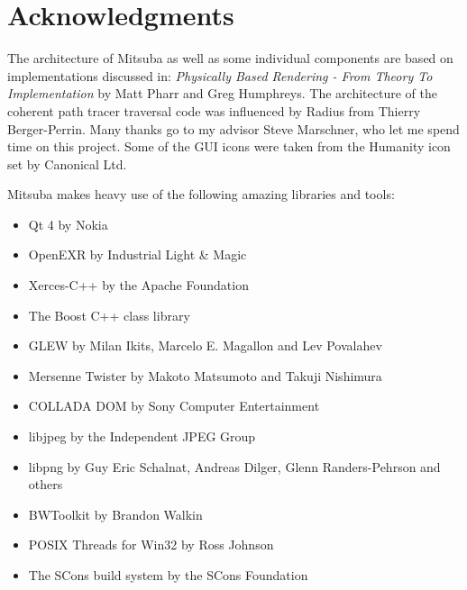 \section{Acknowledgments}
The architecture of Mitsuba as well as some individual components are based on implementations discussed in: \emph{Physically Based Rendering - From Theory To Implementation} by Matt Pharr and Greg Humphreys.
The architecture of the coherent path tracer traversal code was influenced by Radius from Thierry Berger-Perrin.
Many thanks go to my advisor Steve Marschner, who let me spend time on this project.
Some of the GUI icons were taken from the Humanity icon set by Canonical Ltd.

Mitsuba makes heavy use of the following amazing libraries and tools: 
\begin{itemize}
\item Qt 4 by Nokia
\item OpenEXR by Industrial Light \& Magic
\item Xerces-C+\!+ by the Apache Foundation
\item The Boost C+\!+ class library
\item GLEW by Milan Ikits, Marcelo E. Magallon and Lev Povalahev
\item Mersenne Twister by Makoto Matsumoto and Takuji Nishimura
\item COLLADA DOM by Sony Computer Entertainment
\item libjpeg by the Independent JPEG Group
\item libpng by Guy Eric Schalnat, Andreas Dilger, Glenn Randers-Pehrson and \mbox{others}
\item BWToolkit by Brandon Walkin
\item POSIX Threads for Win32 by Ross Johnson
\item The SCons build system by the SCons Foundation
\end{itemize}
